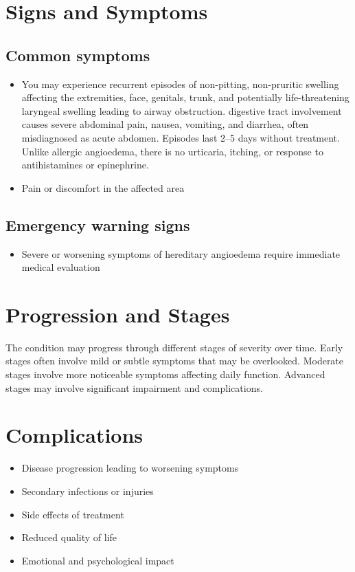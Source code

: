 \section{Signs and Symptoms}

\subsection{Common symptoms}
\begin{itemize}[noitemsep]
  \item You may experience recurrent episodes of non-pitting, non-pruritic swelling affecting the extremities, face, genitals, trunk, and potentially life-threatening laryngeal swelling leading to airway obstruction. digestive tract involvement causes severe abdominal pain, nausea, vomiting, and diarrhea, often misdiagnosed as acute abdomen. Episodes last 2--5 days without treatment. Unlike allergic angioedema, there is no urticaria, itching, or response to antihistamines or epinephrine.

  \item Pain or discomfort in the affected area
  \end{itemize}

\subsection{Emergency warning signs}
\begin{itemize}[noitemsep]
  \item Severe or worsening symptoms of hereditary angioedema require immediate medical evaluation
\end{itemize}
\section{Progression and Stages}
The condition may progress through different stages of severity over time. Early stages often involve mild or subtle symptoms that may be overlooked. Moderate stages involve more noticeable symptoms affecting daily function. Advanced stages may involve significant impairment and complications.
\section{Complications}
\begin{itemize}[noitemsep]
  \item Disease progression leading to worsening symptoms
  \item Secondary infections or injuries
  \item Side effects of treatment
  \item Reduced quality of life
  \item Emotional and psychological impact
\end{itemize}
